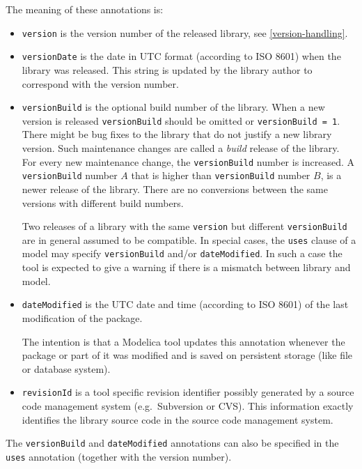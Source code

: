 The meaning of these annotations is:
\begin{itemize}
\item
  \lstinline!version! is the version number of the released library,
  see \cref{version-handling}.
\item
  \lstinline!versionDate! is the date in UTC format (according to ISO
  8601) when the library was released. This string is updated by the
  library author to correspond with the version number.
\item
  \lstinline!versionBuild! is the optional build number of the library.
  When a new version is released \lstinline!versionBuild! should be omitted or
  \lstinline!versionBuild = 1!. There might be bug fixes to the library that do
  not justify a new library version. Such maintenance changes are called
  a \emph{build} release of the library. For every new maintenance change,
  the \lstinline!versionBuild! number is increased. A \lstinline!versionBuild! number $A$
  that is higher than \lstinline!versionBuild! number $B$, is a newer release of the
  library. There are no conversions between the same versions with
  different build numbers.

  Two releases of a library with the same \lstinline!version! but different
  \lstinline!versionBuild! are in general assumed to be compatible. In special
  cases, the \lstinline!uses! clause of a model may specify \lstinline!versionBuild! and/or
  \lstinline!dateModified!.  In such a case the tool is expected to give
  a warning if there is a mismatch between library and model.
\item
  \lstinline!dateModified! is the UTC date and time (according to ISO
  8601) of the last modification of the package.

  \begin{nonnormative}
  The intention is that a Modelica tool updates this annotation whenever the package or part of it was modified and is saved on
  persistent storage (like file or database system).
  \end{nonnormative}
\item
  \lstinline!revisionId! is a tool specific revision identifier
  possibly generated by a source code management system (e.g.\ Subversion
  or CVS). This information exactly identifies the library
  source code in the source code management system.
\end{itemize}

The \lstinline!versionBuild! and \lstinline!dateModified! annotations can also be specified in
the \lstinline!uses! annotation (together with the version number).

